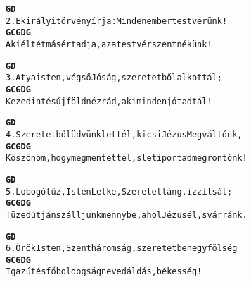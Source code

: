 \cleardoublepage
{}
\kottastart
{}
\kottaend
\begin{minipage}{\textwidth}
\begin{alltt}
\textbf{        G                                      D}
2. E királyi törvény írja: Minden ember testvérünk!
\textbf{       G            C           G        D      G}
   Aki éltét másért adja, az a testvér szent nékünk!
\end{alltt}
\vspace{0.0cm}
\versszakspacing
\end{minipage}
\begin{minipage}{\textwidth}
\begin{alltt}
\textbf{       G                                     D}
3. Atyaisten, végső Jóság, szeretetből alkottál;
\textbf{         G               C            G      D     G}
   Kezed int és új föld néz rád, aki minden jót adtál!
\end{alltt}
\vspace{0.0cm}
\versszakspacing
\end{minipage}
\begin{minipage}{\textwidth}
\begin{alltt}
\textbf{         G                                       D}
4. Szeretetből üdvünk lettél, kicsi Jézus Megváltónk,
\textbf{         G               C             G      D     G}
   Köszönöm, hogy megmentettél, s letiportad megrontónk!
\end{alltt}
\vspace{0.0cm}
\versszakspacing
\end{minipage}
\begin{minipage}{\textwidth}
\begin{alltt}
\textbf{        G                                        D}
5. Lobogó tűz, Isten Lelke, Szeretetláng, izzíts át;
\textbf{         G                C             G    D          G}
   Tüzed útján szálljunk mennybe, ahol Jézus él, s vár ránk.
\end{alltt}
\vspace{0.0cm}
\versszakspacing
\end{minipage}
\begin{minipage}{\textwidth}
\begin{alltt}
\textbf{        G                                         D}
6. Örök Isten, Szentháromság, szeretetben egy fölség
\textbf{        G            C           G       D    G}
   Igaz út és fő boldogság neved áldás, békesség!
\end{alltt}
\vspace{0.0cm}
\versszakspacing
\end{minipage}
~\vspace{1.0cm}
\newline
